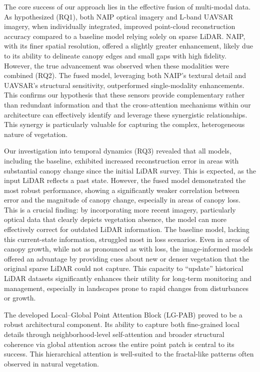 \documentclass[remotesensing,article,accept,pdftex,moreauthors]{Definitions/mdpi}
\begin{document}
The core success of our approach lies in the effective fusion of multi-modal data. As hypothesized (RQ1), both NAIP optical imagery and L-band UAVSAR imagery, when individually integrated, improved point-cloud reconstruction accuracy compared to a baseline model relying solely on sparse LiDAR. NAIP, with its finer spatial resolution, offered a slightly greater enhancement, likely due to its ability to delineate canopy edges and small gaps with high fidelity. However, the true advancement was observed when these modalities were combined (RQ2). The fused model, leveraging both NAIP's textural detail and UAVSAR's structural sensitivity, outperformed single-modality enhancements. This confirms our hypothesis that these sensors provide complementary rather than redundant information and that the cross-attention mechanisms within our architecture can effectively identify and leverage these synergistic relationships. This synergy is particularly valuable for capturing the complex, heterogeneous nature of vegetation.

Our investigation into temporal dynamics (RQ3) revealed that all models, including the baseline, exhibited increased reconstruction error in areas with substantial canopy change since the initial LiDAR survey. This is expected, as the input LiDAR reflects a past state. However, the fused model demonstrated the most robust performance, showing a significantly weaker correlation between error and the magnitude of canopy change, especially in areas of canopy loss. This is a crucial finding: by incorporating more recent imagery, particularly optical data that clearly depicts vegetation absence, the model can more effectively correct for outdated LiDAR information. The baseline model, lacking this current-state information, struggled most in loss scenarios. Even in areas of canopy growth, while not as pronounced as with loss, the image-informed models offered an advantage by providing cues about new or denser vegetation that the original sparse LiDAR could not capture. This capacity to ``update'' historical LiDAR datasets significantly enhances their utility for long-term monitoring and management, especially in landscapes prone to rapid changes from disturbances or growth.

The developed Local--Global Point Attention Block (LG-PAB) proved to be a robust architectural component. Its ability to capture both fine-grained local details through neighborhood-level self-attention and broader structural coherence via global attention across the entire point patch is central to its success. This hierarchical attention is well-suited to the fractal-like patterns often observed in natural vegetation.
\end{document}
